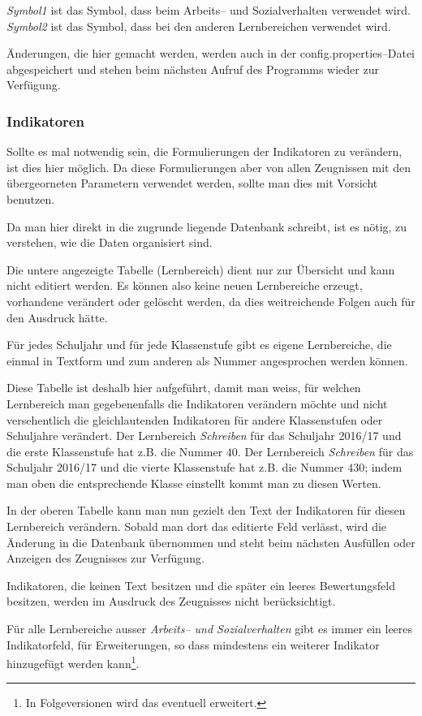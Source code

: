 \documentclass[a4paper,notitlepage,parskip]{scrartcl}
\newcommand\ott{\normalfont\ttfamily}
\begin{document}
\emph{Symbol1} ist das Symbol, dass beim Arbeits-- und Sozialverhalten verwendet wird. \emph{Symbol2} ist das Symbol, dass bei den anderen Lernbereichen verwendet wird.

Änderungen, die hier gemacht werden, werden auch in der {\ott config.properties}--Datei abgespeichert und stehen beim nächsten Aufruf des Programms wieder zur Verfügung.
\subsubsection{Indikatoren}
Sollte es mal notwendig sein, die Formulierungen der Indikatoren zu verändern, ist dies hier möglich.
Da diese Formulierungen aber von allen Zeugnissen mit den übergeorneten Parametern verwendet werden, sollte man dies mit Vorsicht benutzen.

Da man hier direkt in die zugrunde liegende Datenbank schreibt, ist es nötig, zu verstehen, wie die Daten organisiert sind.

Die untere angezeigte Tabelle (Lernbereich) dient nur zur Übersicht und kann nicht editiert werden.
Es können also keine neuen Lernbereiche erzeugt, vorhandene verändert oder gelöscht werden, da dies weitreichende Folgen auch für den Ausdruck hätte.

Für jedes Schuljahr und für jede Klassenstufe gibt es eigene Lernbereiche, die einmal in Textform und zum anderen als Nummer angesprochen werden können.

Diese Tabelle ist deshalb hier aufgeführt, damit man weiss, für welchen Lernbereich man gegebenenfalls die Indikatoren verändern möchte und nicht versehentlich die gleichlautenden Indikatoren für andere Klassenstufen oder Schuljahre verändert. Der Lernbereich \emph{Schreiben} für das Schuljahr 2016/17 und die erste Klassenstufe hat z.B. die Nummer $40$.
Der Lernbereich \emph{Schreiben} für das Schuljahr 2016/17 und die vierte Klassenstufe hat z.B. die Nummer $430$; indem man oben die entsprechende Klasse einstellt kommt man zu diesen Werten.

In der oberen Tabelle kann man nun gezielt den Text der Indikatoren für diesen Lernbereich verändern. Sobald man dort das editierte Feld verlässt, wird die Änderung in die Datenbank übernommen und steht beim nächsten Ausfüllen oder Anzeigen des Zeugnisses zur Verfügung.

Indikatoren, die keinen Text besitzen und die später ein leeres Bewertungsfeld besitzen, werden im Ausdruck des Zeugnisses nicht berücksichtigt.

Für alle Lernbereiche ausser \emph{Arbeits-- und Sozialverhalten} gibt es immer ein leeres Indikatorfeld, für Erweiterungen, so dass mindestens ein weiterer Indikator hinzugefügt werden kann\footnote{In Folgeversionen wird das eventuell erweitert.}.
\end{document}
